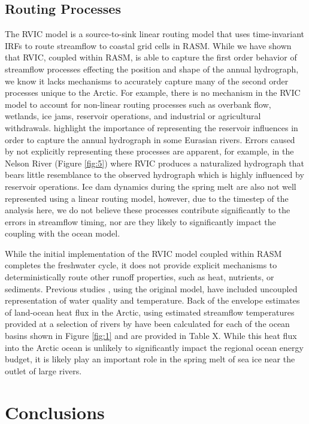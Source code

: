\documentclass[jgrga, draft]{agutex}
\begin{document}
\begin{article}
\subsection{Routing Processes}
The RVIC model is a source-to-sink linear routing model that uses time-invariant IRFs to route streamflow to coastal grid cells in RASM.
While we have shown that RVIC, coupled within RASM, is able to capture the first order behavior of streamflow processes effecting the position and shape of the annual hydrograph, we know it lacks mechanisms to accurately capture many of the second order processes unique to the Arctic.
For example, there is no mechanism in the RVIC model to account for non-linear routing processes such as overbank flow, wetlands, ice jams, reservoir operations, and industrial or agricultural withdrawals.
\citet{Adam_2007} highlight the importance of representing the reservoir influences in order to capture the annual hydrograph in some Eurasian rivers.
Errors caused by not explicitly representing these processes are apparent, for example, in the Nelson River (Figure \ref{fig:5}) where RVIC produces a naturalized hydrograph that bears little resemblance to the observed hydrograph which is highly influenced by reservoir operations.
Ice dam dynamics during the spring melt are also not well represented using a linear routing model, however, due to the timestep of the analysis here, we do not believe these processes contribute significantly to the errors in streamflow timing, nor are they likely to significantly impact the coupling with the ocean model.

While the initial implementation of the RVIC model coupled within RASM completes the freshwater cycle, it does not provide explicit mechanisms to deterministically route other runoff properties, such as heat, nutrients, or sediments.
Previous studies \citep[e.g.][]{vanVliet_2011,vanVliet_2012}, using the original \citet{Lohmann_1996} model, have included uncoupled representation of water quality and temperature.
Back of the envelope estimates of land-ocean heat flux in the Arctic, using estimated streamflow temperatures provided at a selection of rivers by \citet{Lammers_2007} have been calculated for each of the ocean basins shown in Figure \ref{fig:1} and are provided in Table X.
While this heat flux into the Arctic ocean is unlikely to significantly impact the regional ocean energy budget, it is likely play an important role in the spring melt of sea ice near the outlet of large rivers.

\section{Conclusions}


\end{article}
\end{document}
